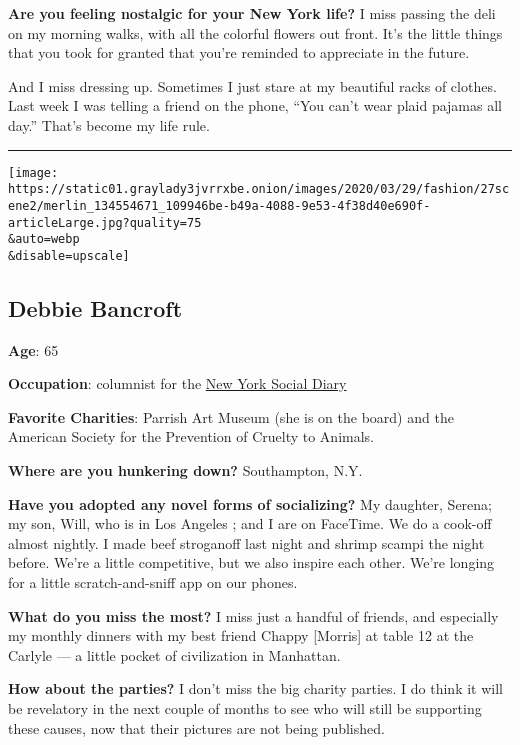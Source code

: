 \textbf{Are you feeling nostalgic for your New York life?} I miss
passing the deli on my morning walks, with all the colorful flowers out
front. It's the little things that you took for granted that you're
reminded to appreciate in the future.

And I miss dressing up. Sometimes I just stare at my beautiful racks of
clothes. Last week I was telling a friend on the phone, ``You can't wear
plaid pajamas all day.'' That's become my life rule.

\begin{center}\rule{0.5\linewidth}{\linethickness}\end{center}

\texttt{[image: https://static01.graylady3jvrrxbe.onion/images/2020/03/29/fashion/27scene2/merlin\_134554671\_109946be-b49a-4088-9e53-4f38d40e690f-articleLarge.jpg?quality=75\\\&auto=webp\\\&disable=upscale]}

\hypertarget{debbie-bancroft}{%
\subsection{Debbie Bancroft}\label{debbie-bancroft}}

\textbf{Age}: 65

\textbf{Occupation}: columnist for the
\href{https://www.newyorksocialdiary.com/}{New York Social Diary}

\textbf{Favorite Charities}: Parrish Art Museum (she is on the board)
and the American Society for the Prevention of Cruelty to Animals.

\textbf{Where are you hunkering down?} Southampton, N.Y.

\textbf{Have you adopted any novel forms of socializing?} My daughter,
Serena; my son, Will, who is in Los Angeles ; and I are on FaceTime. We
do a cook-off almost nightly. I made beef stroganoff last night and
shrimp scampi the night before. We're a little competitive, but we also
inspire each other. We're longing for a little scratch-and-sniff app on
our phones.

\textbf{What do you miss the most?} I miss just a handful of friends,
and especially my monthly dinners with my best friend Chappy
{[}Morris{]} at table 12 at the Carlyle --- a little pocket of
civilization in Manhattan.

\textbf{How about the parties?} I don't miss the big charity parties. I
do think it will be revelatory in the next couple of months to see who
will still be supporting these causes, now that their pictures are not
being published.

